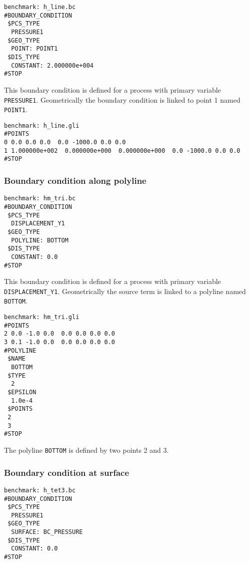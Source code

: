 \begin{verbatim}
benchmark: h_line.bc
#BOUNDARY_CONDITION
 $PCS_TYPE
  PRESSURE1
 $GEO_TYPE
  POINT: POINT1
 $DIS_TYPE
  CONSTANT: 2.000000e+004
#STOP
\end{verbatim}

This boundary condition is defined for a process with primary variable
\texttt{PRESSURE1}. Geometrically the boundary condition is linked to point 1
named \texttt{POINT1}.

\begin{verbatim}
benchmark: h_line.gli
#POINTS
0 0.0 0.0 0.0  0.0 -1000.0 0.0 0.0
1 1.000000e+002  0.000000e+000  0.000000e+000  0.0 -1000.0 0.0 0.0
#STOP
\end{verbatim}

\subsubsection{Boundary condition along polyline}

\begin{verbatim}
benchmark: hm_tri.bc
#BOUNDARY_CONDITION
 $PCS_TYPE
  DISPLACEMENT_Y1
 $GEO_TYPE
  POLYLINE: BOTTOM
 $DIS_TYPE
  CONSTANT: 0.0
#STOP\end{verbatim}

This boundary condition is defined for a process with primary variable
\texttt{DISPLACEMENT\_Y1}. Geometrically the source term is linked to a polyline
named \texttt{BOTTOM}.

\begin{verbatim}
benchmark: hm_tri.gli
#POINTS
2 0.0 -1.0 0.0  0.0 0.0 0.0 0.0
3 0.1 -1.0 0.0  0.0 0.0 0.0 0.0
#POLYLINE
 $NAME
  BOTTOM
 $TYPE
  2
 $EPSILON
  1.0e-4
 $POINTS
 2
 3
#STOP
\end{verbatim}

The polyline \texttt{BOTTOM} is defined by two points 2 and 3.

\subsubsection{Boundary condition at surface}

\begin{verbatim}
benchmark: h_tet3.bc
#BOUNDARY_CONDITION
 $PCS_TYPE
  PRESSURE1
 $GEO_TYPE
  SURFACE: BC_PRESSURE
 $DIS_TYPE
  CONSTANT: 0.0
#STOP
\end{verbatim}

